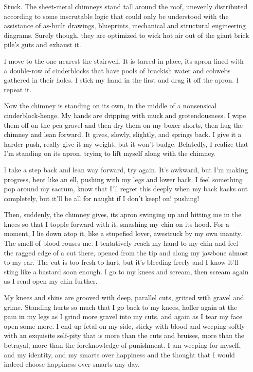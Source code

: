 Stuck. The sheet-metal chimneys stand tall around the roof,
unevenly distributed according to some inscrutable logic that could
only be understood with the assistance of as-built drawings,
blueprints, mechanical and structural engineering diagrams. Surely
though, they are optimized to wick hot air out of the giant brick
pile’s guts and exhaust it.

I move to the one nearest the stairwell. It is tarred in place, its
apron lined with a double-row of cinderblocks that have pools of
brackish water and cobwebs gathered in their holes. I stick my hand
in the first and drag it off the apron. I repeat it.

Now the chimney is standing on its own, in the middle of a
nonsensical cinderblock-henge. My hands are dripping with muck and
grotendousness. I wipe them off on the pea gravel and then dry them
on my boxer shorts, then hug the chimney and lean forward. It
gives, slowly, slightly, and springs back. I give it a harder push,
really give it my weight, but it won’t budge. Belatedly, I realize
that I’m standing on its apron, trying to lift myself along with
the chimney.

I take a step back and lean way forward, try again. It’s awkward,
but I’m making progress, bent like an ell, pushing with my legs and
lower back. I feel something pop around my sacrum, know that I’ll
regret this deeply when my back kacks out completely, but it’ll be
all for naught if I don’t keep! on! pushing!

Then, suddenly, the chimney gives, its apron swinging up and
hitting me in the knees so that I topple forward with it, smashing
my chin on its hood. For a moment, I lie down atop it, like a
stupefied lover, awestruck by my own inanity. The smell of blood
rouses me. I tentatively reach my hand to my chin and feel the
ragged edge of a cut there, opened from the tip and along my
jawbone almost to my ear. The cut is too fresh to hurt, but it’s
bleeding freely and I know it’ll sting like a bastard soon enough.
I go to my knees and scream, then scream again as I rend open my
chin further.

My knees and shins are grooved with deep, parallel cuts, gritted
with gravel and grime. Standing hurts so much that I go back to my
knees, holler again at the pain in my legs as I grind more gravel
into my cuts, and again as I tear my face open some more. I end up
fetal on my side, sticky with blood and weeping softly with an
exquisite self-pity that is more than the cuts and bruises, more
than the betrayal, more than the foreknowledge of punishment. I am
weeping for myself, and my identity, and my smarts over happiness
and the thought that I would indeed choose happiness over smarts
any day.

